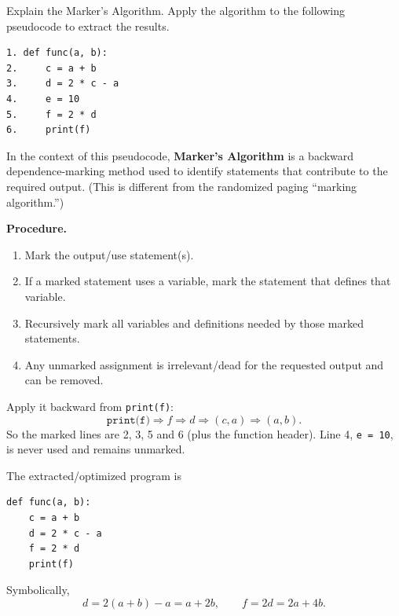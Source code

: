 \documentclass[11pt,a4paper]{article}
\begin{document}
\begin{qaquestion}
Explain the Marker's Algorithm. Apply the algorithm to the following pseudocode to extract the results.
\begin{lstlisting}
1. def func(a, b):
2.     c = a + b
3.     d = 2 * c - a
4.     e = 10
5.     f = 2 * d
6.     print(f)
\end{lstlisting}
\end{qaquestion}
\begin{qaanswer}[Answer 5(a)]
In the context of this pseudocode, \textbf{Marker's Algorithm} is a backward dependence-marking method used to identify statements that contribute to the required output. (This is different from the randomized paging ``marking algorithm.'')

\textbf{Procedure.}
\begin{enumerate}[leftmargin=*]
\item Mark the output/use statement(s).
\item If a marked statement uses a variable, mark the statement that defines that variable.
\item Recursively mark all variables and definitions needed by those marked statements.
\item Any unmarked assignment is irrelevant/dead for the requested output and can be removed.
\end{enumerate}

Apply it backward from \texttt{print(f)}:
\[
\texttt{print(f)}\Rightarrow f\Rightarrow d\Rightarrow(c,a)\Rightarrow(a,b).
\]
So the marked lines are 2, 3, 5 and 6 (plus the function header). Line 4, \texttt{e = 10}, is never used and remains unmarked.

\begin{center}
\end{center}

The extracted/optimized program is
\begin{lstlisting}
def func(a, b):
    c = a + b
    d = 2 * c - a
    f = 2 * d
    print(f)
\end{lstlisting}
Symbolically,
\[
d=2(a+b)-a=a+2b,
\qquad
f=2d=\boxed{2a+4b}.
\]
\end{qaanswer}
\end{document}
